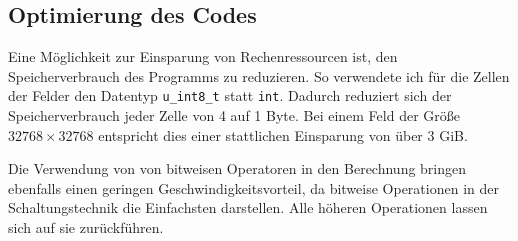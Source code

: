 \documentclass[german,plainarticle,hyperref,utf8]{zihpub}
\begin{document}
	\subsection{Optimierung des Codes}
	Eine Möglichkeit zur Einsparung von Rechenressourcen ist, den Speicherverbrauch des Programms zu reduzieren. So verwendete ich für die Zellen der Felder den Datentyp \verb|u_int8_t| statt \verb|int|. Dadurch reduziert sich der Speicherverbrauch jeder Zelle von 4 auf 1 Byte. Bei einem Feld der Größe $32768\times 32768$ entspricht dies einer stattlichen Einsparung von über 3 GiB.
	
	Die Verwendung von von bitweisen Operatoren in den Berechnung bringen ebenfalls einen geringen Geschwindigkeitsvorteil, da bitweise Operationen in der Schaltungstechnik die Einfachsten darstellen. Alle höheren Operationen lassen sich auf sie zurückführen.
	
\end{document}
